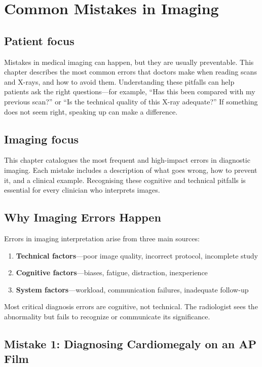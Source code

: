 \chapter{Common Mistakes in Imaging}

\section*{Patient focus}
Mistakes in medical imaging can happen, but they are usually preventable. This chapter describes the most common errors that doctors make when reading scans and X-rays, and how to avoid them. Understanding these pitfalls can help patients ask the right questions---for example, ``Has this been compared with my previous scan?'' or ``Is the technical quality of this X-ray adequate?'' If something does not seem right, speaking up can make a difference.

\section*{Imaging focus}
This chapter catalogues the most frequent and high-impact errors in diagnostic imaging. Each mistake includes a description of what goes wrong, how to prevent it, and a clinical example. Recognising these cognitive and technical pitfalls is essential for every clinician who interprets images.
\label{ch:ch100_mistakes}

\section{Why Imaging Errors Happen}
Errors in imaging interpretation arise from three main sources:
\begin{enumerate}
    \item \textbf{Technical factors}---poor image quality, incorrect protocol, incomplete study
    \item \textbf{Cognitive factors}---biases, fatigue, distraction, inexperience
    \item \textbf{System factors}---workload, communication failures, inadequate follow-up
\end{enumerate}

Most critical diagnosis errors are cognitive, not technical. The radiologist sees the abnormality but fails to recognize or communicate its significance.

\clearpage

\section{Mistake 1: Diagnosing Cardiomegaly on an AP Film}


